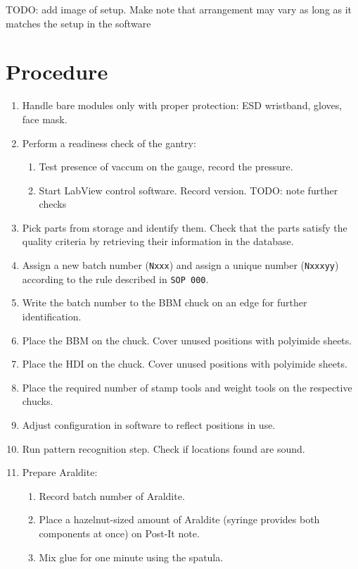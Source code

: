 \documentclass[12pt]{unlsilabsop}
\begin{document}
TODO: add image of setup. Make note that arrangement may vary as long as it matches the setup in the software

\section{Procedure}

\begin{enumerate}
    \item Handle bare modules only with proper protection: ESD wristband, gloves, face mask.
    \item Perform a readiness check of the gantry:
    \begin{enumerate}
	\item Test presence of vaccum on the gauge, record the pressure.
	\item Start LabView control software. Record version. TODO: note further checks
    \end{enumerate}
    \item Pick parts from storage and identify them. Check that the parts satisfy the quality criteria by retrieving their information in the database.
    \item Assign a new batch number (\texttt{Nxxx}) and assign a unique number (\texttt{Nxxxyy}) according to the rule described in \texttt{SOP~000}.
    \item Write the batch number to the BBM chuck on an edge for further identification.
    \item Place the BBM on the chuck. Cover unused positions with polyimide sheets.
    \item Place the HDI on the chuck. Cover unused positions with polyimide sheets.
    \item Place the required number of stamp tools and weight tools on the respective chucks.
    \item Adjust configuration in software to reflect positions in use.
    \item Run pattern recognition step. Check if locations found are sound.
    \item Prepare Araldite:
    \begin{enumerate}
	\item Record batch number of Araldite.
	\item Place a hazelnut-sized amount of Araldite (syringe provides both components at once) on Post-It note.
	\item Mix glue for one minute using the spatula.

\end{enumerate}
\end{enumerate}
\end{document}
